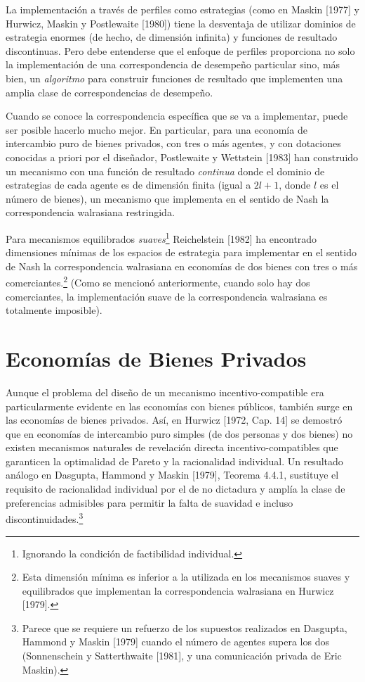 \documentclass[12pt, letterpaper]{article}
\begin{document}
La implementación a través de perfiles como estrategias (como en Maskin [1977] y Hurwicz, Maskin y Postlewaite [1980]) tiene la desventaja de utilizar dominios de estrategia enormes (de hecho, de dimensión infinita) y funciones de resultado discontinuas. Pero debe entenderse que el enfoque de perfiles proporciona no solo la implementación de una correspondencia de desempeño particular sino, más bien, un \textit{algoritmo} para construir funciones de resultado que implementen una amplia clase de correspondencias de desempeño.

Cuando se conoce la correspondencia específica que se va a implementar, puede ser posible hacerlo mucho mejor. En particular, para una economía de intercambio puro de bienes privados, con tres o más agentes, y con dotaciones conocidas a priori por el diseñador, Postlewaite y Wettstein [1983] han construido un mecanismo con una función de resultado \textit{continua} donde el dominio de estrategias de cada agente es de dimensión finita (igual a $2l + 1$, donde $l$ es el número de bienes), un mecanismo que implementa en el sentido de Nash la correspondencia walrasiana restringida.

Para mecanismos equilibrados \textit{suaves}\footnote{Ignorando la condición de factibilidad individual.} Reichelstein [1982] ha encontrado dimensiones mínimas de los espacios de estrategia para implementar en el sentido de Nash la correspondencia walrasiana en economías de dos bienes con tres o más comerciantes.\footnote{Esta dimensión mínima es inferior a la utilizada en los mecanismos suaves y equilibrados que implementan la correspondencia walrasiana en Hurwicz [1979].} (Como se mencionó anteriormente, cuando solo hay dos comerciantes, la implementación suave de la correspondencia walrasiana es totalmente imposible).

\section*{Economías de Bienes Privados}

Aunque el problema del diseño de un mecanismo incentivo-compatible era particularmente evidente en las economías con bienes públicos, también surge en las economías de bienes privados. Así, en Hurwicz [1972, Cap. 14] se demostró que en economías de intercambio puro simples (de dos personas y dos bienes) no existen mecanismos naturales de revelación directa incentivo-compatibles que garanticen la optimalidad de Pareto y la racionalidad individual. Un resultado análogo en Dasgupta, Hammond y Maskin [1979], Teorema 4.4.1, sustituye el requisito de racionalidad individual por el de no dictadura y amplía la clase de preferencias admisibles para permitir la falta de suavidad e incluso discontinuidades.\footnote{Parece que se requiere un refuerzo de los supuestos realizados en Dasgupta, Hammond y Maskin [1979] cuando el número de agentes supera los dos (Sonnenschein y Satterthwaite [1981], y una comunicación privada de Eric Maskin).}
\end{document}
